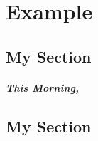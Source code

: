 \chapter{Example}
\section*{My Section}
\lipsum[1]
\paragraph{This Morning,} \lipsum[1]
\section*{My Section}
\texttt{
    \lipsum[1]
}
\paragraph{}
\asterism
\paragraph{}
\textit{
    \lipsum[1]
}
\paragraph{}
{\handwriting
    \lipsum[1]
}